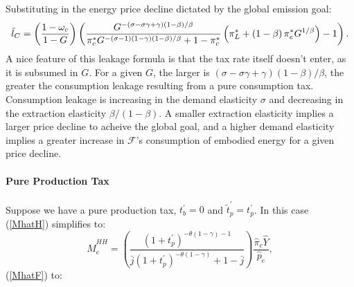 \documentclass[notitlepage,12pt]{article}
\begin{document}
Substituting in the energy price decline dictated by the global emission
goal:%
\begin{equation}
\tilde{l}_{C}=\left( \frac{1-\omega _{c}}{1-G}\right) \left( \frac{%
G^{-\left( \sigma -\sigma \gamma +\gamma \right) \left( 1-\beta \right)
/\beta }}{\pi _{c}^{\ast }G^{-\left( \sigma -1\right) \left( 1-\gamma
\right) \left( 1-\beta \right) /\beta }+1-\pi _{c}^{\ast }}\left( \pi
_{L}^{\ast }+\left( 1-\beta \right) \pi _{e}^{\ast }G^{1/\beta }\right)
-1\right) .  \label{modified consumption leakage with full BTA}
\end{equation}%
A nice feature of this leakage formula is that the tax rate itself doesn't
enter, as it is subsumed in $G$. For a given $G$, the larger is $\left(
\sigma -\sigma \gamma +\gamma \right) \left( 1-\beta \right) /\beta $, the
greater the consumption leakage resulting from a pure consumption tax.
Consumption leakage is increasing in the demand elasticity $\sigma $ and
decreasing in the extraction elasticity $\beta /\left( 1-\beta \right) $. A
smaller extraction elasticity implies a larger price decline to acheive the
global goal, and a higher demand elasticity implies a greater increase in $%
\mathcal{F}$'s consumption of embodied energy for a given price decline.

\paragraph{Pure Production Tax}

Suppose we have a pure production tax, $t_{b}^{\prime }=0$ and $\tilde{t}%
_{p}^{\prime }=t_{p}^{\prime }$. In this case (\ref{MhatH}) simplifies to:%
\begin{equation*}
\hat{M}_{e}^{HH}=\left( \frac{\left( 1+t_{p}^{\prime }\right) ^{-\theta
\left( 1-\gamma \right) -1}}{\bar{j}\left( 1+t_{p}^{\prime }\right)
^{-\theta \left( 1-\gamma \right) }+1-\bar{j}}\right) \frac{\hat{\pi}_{c}%
\hat{Y}}{\hat{p}_{e}},
\end{equation*}%
(\ref{MhatF}) to:
\end{document}
